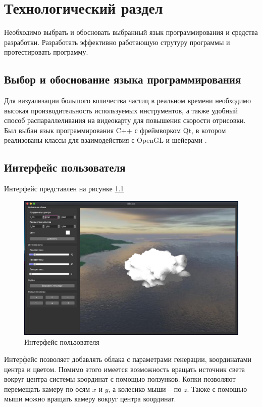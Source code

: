 \chapter{Технологический раздел}
\label{cha:impl}

Необходимо выбрать и обосновать выбранный язык программирования и средства разработки.
Разработать эффективно работающую струтуру программы и протестировать программу.

\section{Выбор и обоснование языка программирования}

Для визуализации большого количества частиц в реальном времени необходимо высокая производительность
используемых инструментов, а также удобный способ распараллеливания на видеокарту для повышения
скорости отрисовки. Был выбан язык программирования C++ с фреймворком Qt, в котором реализованы классы
для взаимодействия с OpenGL и шейерами \cite{QtOpenGL}.

\section{Интерфейс пользователя}

Интерфейс представлен на рисунке \ref{img:interface}

\begin{figure}[H]
    \centering
    \includegraphics[scale=0.35]{img/interface.png}
    \caption{Интерфейс пользователя}
    \label{img:interface}
\end{figure}

Интерфейс позволяет добавлять облака с параметрами генерации, координатами центра и цветом.
Помимо этого имеется возможность вращать источник света вокруг центра системы координат с помощью ползунков.
Копки позволяют перемещать камеру по осям $x$ и $y$, а колесико мыши -- по $z$. Также с помощью мыши
можно вращать камеру вокруг центра координат.

